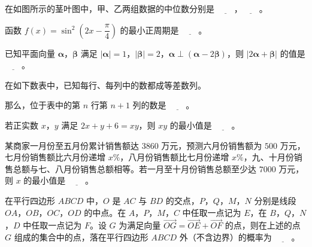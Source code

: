 \Needspace{0.4\textheight}
\begingroup
\renewenvironment{question}{\Needspace{0.5\textheight}}{}
\begin{question}
在如图所示的茎叶图中，甲、乙两组数据的中位数分别是 $\underline{\qquad}$，$\underline{\qquad}$。
\nopagebreak[4]
\begin{center}\end{center}
\nopagebreak[4]
\end{question}
\endgroup
\begin{question}
函数 $f(x)=\sin^2\left(2x-\dfrac{\pi}{4}\right)$ 的最小正周期是 $\underline{\qquad}$。

\end{question}
\begin{question}
已知平面向量 $\boldsymbol\alpha$，$\boldsymbol\beta$ 满足 $|\boldsymbol\alpha|=1$，$|\boldsymbol\beta|=2$，$\boldsymbol\alpha\perp(\boldsymbol\alpha-2\boldsymbol\beta)$，则 $|2\boldsymbol\alpha+\boldsymbol\beta|$ 的值是 $\underline{\qquad}$。

\Needspace{0.4\textheight}
\end{question}
\begingroup
\renewenvironment{question}{\Needspace{0.5\textheight}}{}
\begin{question}
在如下数表中，已知每行、每列中的数都成等差数列。
\nopagebreak[4]
\begin{center}\end{center}
\nopagebreak[4]
那么，位于表中的第 $n$ 行第 $n+1$ 列的数是 $\underline{\qquad}$。

\end{question}
\endgroup
\begin{question}
若正实数 $x$，$y$ 满足 $2x+y+6=xy$，则 $xy$ 的最小值是 $\underline{\qquad}$。

\end{question}
\begin{question}
某商家一月份至五月份累计销售额达 $3860$ 万元，预测六月份销售额为 $500$ 万元，七月份销售额比六月份递增 $x\%$，八月份销售额比七月份递增 $x\%$，九、十月份销售总额与七、八月份销售总额相等。若一月至十月份销售总额至少达 $7000$ 万元，则 $x$ 的最小值是 $\underline{\qquad}$。

\Needspace{0.4\textheight}
\end{question}
\begingroup
\renewenvironment{question}{\Needspace{0.5\textheight}}{}
\begin{question}
在平行四边形 $ABCD$ 中，$O$ 是 $AC$ 与 $BD$ 的交点，$P$，$Q$，$M$，$N$ 分别是线段 $OA$，$OB$，$OC$，$OD$ 的中点。在 $A$，$P$，$M$，$C$ 中任取一点记为 $E$，在 $B$，$Q$，$N$，$D$ 中任取一点记为 $F$。设 $G$ 为满足向量 $\overrightarrow{OG}=\overrightarrow{OE}+\overrightarrow{OF}$ 的点，则在上述的点 $G$ 组成的集合中的点，落在平行四边形 $ABCD$ 外（不含边界）的概率为 $\underline{\qquad}$。
\nopagebreak[4]
\begin{center}\end{center}
\nopagebreak[4]
\end{question}
